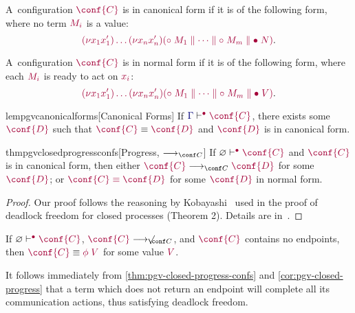 \documentclass[main.tex]{subfiles}
\begin{document}
\begin{compacttheorems}
  \begin{definition}%
    \label{def:pgv-canonical-forms}
    A~configuration $\tm{\conf{C}}$ is in canonical form if it is of the following form, where no term $\tm{M_i}$ is a value:
    \[
      \tm{\res{x_1}{x'_1}{\dots\res{x_n}{x'_n}{(\child\;M_1\parallel\dots\parallel\child\;M_m\parallel\main\;N)}}}.
    \]
  \end{definition}
  \begin{definition}%
    A~configuration $\tm{\conf{C}}$ is in normal form if it is of the following form, where each $\tm{M_i}$ is ready to act on $\tm{x_i}$:
    \[
      \tm{\res{x_1}{x'_1}{\dots\res{x_n}{x'_n}{(\child\;M_1\parallel\dots\parallel\child\;M_m\parallel\main\;V)}}}.
    \]
  \end{definition}
  \begin{restatablelemma}{lempgvcanonicalforms}[Canonical Forms]%
    \label{lem:pgv-canonical-forms}
    If $\cseq[\main]{\ty{\Gamma}}{\conf{C}}$, there exists some $\tm{\conf{D}}$ such that $\tm{\conf{C}}\equiv\tm{\conf{D}}$ and $\tm{\conf{D}}$ is in canonical form.
  \end{restatablelemma}
  \begin{restatabletheorem}{thmpgvclosedprogressconfs}[Progress, $\cred$]%
    \label{thm:pgv-closed-progress-confs}
    If $\cseq[\main]{\emptyenv}{\conf{C}}$ and $\tm{\conf{C}}$ is in canonical form, then either $\tm{\conf{C}}\cred\tm{\conf{D}}$ for some $\tm{\conf{D}}$; or $\tm{\conf{C}\equiv\conf{D}}$ for some $\tm{\conf{D}}$ in normal form.
  \end{restatabletheorem}
  \begin{proof}
    Our proof follows the reasoning by Kobayashi~\cite{kobayashi06} used in the proof of deadlock freedom for closed processes (Theorem 2). Details are in~.
  \end{proof}
  \begin{corollary}%
    \label{cor:pgv-closed-progress}
    If $\cseq[\main]{\emptyenv}{\conf{C}}$, $\tm{\conf{C}}\centernot\cred$, and $\tm{\conf{C}}$ contains no endpoints, then $\tm{\conf{C}}\equiv\tm{\phi\;V}$ for some value $\tm{V}$.
  \end{corollary}
\end{compacttheorems}
It follows immediately from \cref{thm:pgv-closed-progress-confs} and \cref{cor:pgv-closed-progress} that a term which does not return an endpoint will complete all its communication actions, thus satisfying deadlock freedom.
\end{document}
